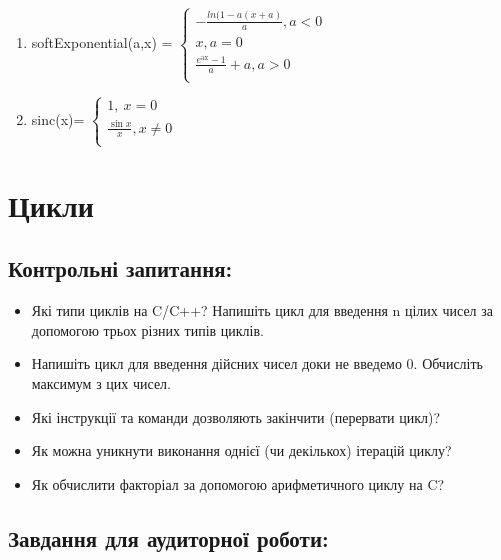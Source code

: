 \documentclass[a5paper,titlepage,openany,twoside,
]
{book_unv}%
\makeatletter
\newcommand{\xslalph}[1]{\expandafter\@xslalph\csname c@#1\endcsname}
\newcommand{\@xslalph}[1]{%
    \ifcase#1\or а\or б\or в\or г\or д\or e\or є\or ж\or з\or i%
    \or й\or к\or л\or м\or н\or о\or п\or р\or с\or т%
    \or у\or ф\or х\or ц\or ч\or ш\or ю\or я\or аа\or бб\or вв%
    \else\@ctrerr\fi%
}
\makeatother
\begin{document}
\begin{enumerate}
\begin{enumerate}[label=\xslalph*)]
\item 
softExponential(a,x) = \(\left\{ \begin{matrix}
 - \frac{ln(1 - a(x + a)}{a},a < 0 \\
x,a = 0 \\
\frac{e^{\text{ax}} - 1}{a} + a,a > 0 \\
\end{matrix} \right.\ \)

\item 
sinc(x)= \(\left\{ \begin{matrix}
1,\ x = 0 \\
\frac{\sin x}{x},x \neq 0 \\
\end{matrix} \right.\ \)

 \end{enumerate}
\end{enumerate}


\chapter{ Цикли }
%

\section{Контрольні запитання:}
\begin{itemize}
\item
  Які типи циклів на C/C++? Напишіть цикл для введення n цілих чисел
  за допомогою трьох різних типів циклів.
\item
  Напишіть цикл для введення дійсних чисел доки не введемо 0. Обчисліть
  максимум з цих чисел.
\item
  Які інструкції та команди дозволяють закінчити (перервати цикл)?
\item
  Як можна уникнути виконання однієї (чи декількох) ітерацій циклу?
\item
  Як обчислити факторіал за допомогою арифметичного циклу на C?
\end{itemize}

\section{Завдання для аудиторної роботи:}
\end{document}
